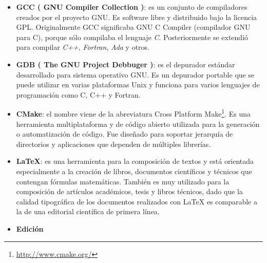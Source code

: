 \begin{itemize}
\item \textbf{GCC ( GNU Compiler Collection )}: es un conjunto de compiladores creados por el proyecto GNU. Es software libre y distribuido bajo la licencia GPL. 
Originalmente GCC significaba GNU C Compiler (compilador GNU para C), porque sólo compilaba el lenguaje \textit{C}. Posteriormente se extendió para compilar \textit{C++}, \textit{Fortran}, \textit{Ada} y otros.

\item \textbf{GDB ( The GNU Project Debbuger )}: es el depurador estándar desarrollado para  sistema operativo GNU. Es un depurador portable que se puede utilizar en varias plataformas Unix y funciona para varios lenguajes de programación como C, C++ y Fortran.

\item \textbf{CMake}\label{tool:cmake}: el nombre viene de la abreviatura Cross Platform Make\footnote{\url{http://www.cmake.org/}}. Es una herramienta multiplataforma y de código abierto utilizada para la generación o automatización de código. 
Fue diseñado para soportar jerarquía de directorios y aplicaciones que dependen de múltiples librerías. 

\item \textbf{\LaTeX}: es una herramienta para la composición de textos y está orientada especialmente a la creación de libros,
 documentos científicos y técnicos que contengan fórmulas matemáticas. También es muy utilizado para la composición de artículos académicos,
 tesis y libros técnicos, dado que la calidad tipográfica de los documentos realizados con LaTeX es comparable a la de una editorial científica de primera línea.

\item \textbf{Edición}


\end{itemize}
